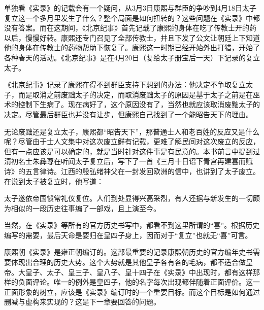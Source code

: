 
单独看《实录》的记载会有一个疑问，从3月3日康熙与群臣的争吵到4月18日太子复立这一个多月里发生了什么？整个局面是如何扭转的？这些问题在《实录》中都没有答案。而在这期间，《北京纪事》首先记载了康熙的身体在吃了传教士开的药以后，慢慢好转。康熙还专门召见了全部传教士，并且下发了公文让朝廷上下知道他的身体在传教士的药物帮助下恢复了。康熙这一时期已经开始外出打猎，开始了各种春天的活动。《北京纪事》是在4月20日（复给太子册宝后一天）下记录的复立太子。



《北京纪事》记录了康熙在得不到群臣支持下想到的办法：他决定不争取复立太子，而是取消之前废黜太子的决定，而取消废黜太子的原因是基于太子之前是在巫术的控制下生病了。现在病好了，这个原因没有了，当然也就应该取消废黜太子的决定。尽管最后群臣也并没有让步，但康熙自己找到了一个能昭告天下的理由。



无论废黜还是复立太子，康熙都“昭告天下”，那普通士人和老百姓的反应又是什么呢？尽管由于士人文集中对这次废立鲜有记载，更难了解民间对这次废立的反应，但有一点应该是可以确定的，就是当时针对这件事是有民意的。本书前言中提到过清初名士朱彝尊在听闻太子复立后，写下了一首《三月十日诏下青宫再建喜而赋诗》的五言律诗。江西的殷弘绪神父在一封发回欧洲的信中，也讲到了太子废立。在说到太子被复立时，他写道：



\begin{bookquote}太子遂依帝国惯常礼仪复位。人们到处显得兴高采烈，有人还据与新发生的一切颇为相似的一段历史往事编了一部戏，且上演至今。\end{bookquote}


当然，在《实录》等所有的官方历史书写中，都看不到这里所谓的“喜”。根据历史编写的需要，最后天命是要归在皇四子身上，因而对于“复立”也就无“喜”可言。



康熙朝《实录》是雍正朝编订的。这部最重要的记录康熙朝历史的官方编年史书需要体现出合理的历史大势。这个大势就是其他皇子各有各的毛病，都不适合做皇帝。大皇子、太子、皇三子、皇八子、皇十四子在《实录》中出现时，都有这样那样的负面评论。唯一的例外是皇四子，他的名字每次出现都伴随着正面评价。这一正面形象的树立，应该是《实录》编订时的一个重要目标。而这个目标是如何通过删减与虚构来实现的？这是下一章要回答的问题。


